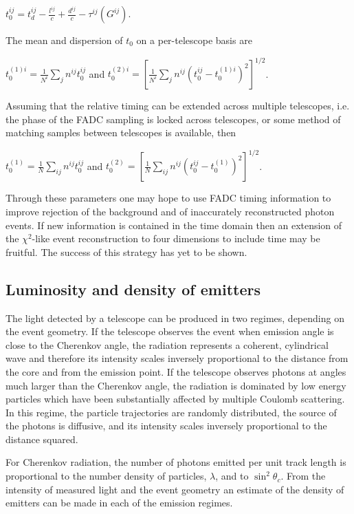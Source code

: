 \documentclass[letterpaper]{article}
\begin{document}
$\displaystyle t_0^{ij}=t_d^{ij}-\frac{l^{ij}}{c}+\frac{d^{ij}}{c}
-\tau^{ij}(G^{ij})$.

The mean and dispersion of $t_0$ on a per-telescope basis are

$\displaystyle t_0^{(1)i} = \frac{1}{N^i}\sum\limits_{j}n^{ij}t_0^{ij}$
and
$\displaystyle t_0^{(2)i} = \left[
\frac{1}{N^i}\sum\limits_{j}n^{ij}\left(t_0^{ij}-t_0^{(1)i}\right)^2
\right]^{1/2}$.

Assuming that the relative timing can be extended across multiple
telescopes, i.e. the phase of the FADC sampling is locked across
telescopes, or some method of matching samples between telescopes is
available, then

$\displaystyle t_0^{(1)} = \frac{1}{N}\sum\limits_{ij}n^{ij}t_0^{ij}$
and
$\displaystyle t_0^{(2)} = \left[
\frac{1}{N}\sum\limits_{ij}n^{ij}\left(t_0^{ij}-t_0^{(1)}\right)^2
\right]^{1/2}$.

Through these parameters one may hope to use FADC timing information
to improve rejection of the background and of inaccurately
reconstructed photon events. If new information is contained in the
time domain then an extension of the $\chi^2$-like event
reconstruction to four dimensions to include time may be fruitful. The
success of this strategy has yet to be shown.

\subsection{Luminosity and density of emitters}

The light detected by a telescope can be produced in two regimes,
depending on the event geometry. If the telescope observes the event
when emission angle is close to the Cherenkov angle, the radiation
represents a coherent, cylindrical wave and therefore its intensity
scales inversely proportional to the distance from the core and from
the emission point. If the telescope observes photons at angles much
larger than the Cherenkov angle, the radiation is dominated by low
energy particles which have been substantially affected by multiple
Coulomb scattering. In this regime, the particle trajectories are
randomly distributed, the source of the photons is diffusive, and
its intensity scales inversely proportional to the distance squared.

For Cherenkov radiation, the number of photons emitted per unit track
length is proportional to the number density of particles, $\lambda$,
and to $\sin^2\theta_c$.  From the intensity of measured light and the
event geometry an estimate of the density of emitters can be made in
each of the emission regimes.
\end{document}
